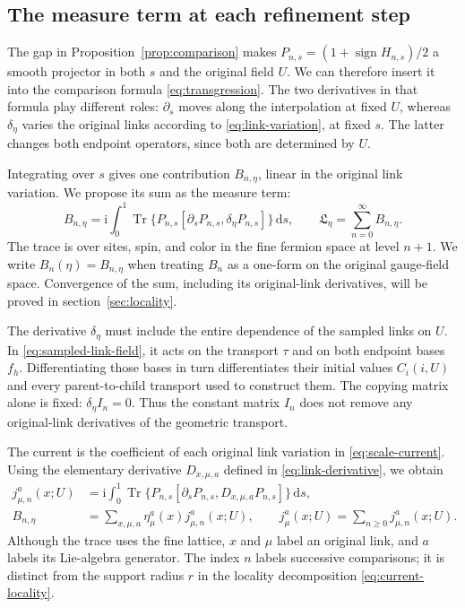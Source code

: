 \documentclass[11pt,a4paper]{article}
\theoremstyle{remark}
\DeclareMathOperator{\Tr}{Tr}
\newcommand{\dd}{\mathrm d}
\newcommand{\ii}{\mathrm i}
\begin{document}
\subsection{The measure term at each refinement step}

The gap in Proposition~\ref{prop:comparison} makes
$P_{n,s}=(1+\operatorname{sign}H_{n,s})/2$ a smooth projector in both
$s$ and the original field $U$. We can therefore insert it into the
comparison formula \eqref{eq:transgression}. The two derivatives in that
formula play different roles: $\partial_s$ moves along the interpolation
at fixed $U$, whereas $\delta_\eta$ varies the original links according
to \eqref{eq:link-variation}, at fixed $s$. The latter changes both
endpoint operators, since both are determined by $U$.

Integrating over $s$ gives one contribution $B_{n,\eta}$, linear in the
original link variation. We propose its sum as the measure term:
\begin{equation}
 B_{n,\eta}=\ii\int_0^1\Tr\{P_{n,s}
       [\partial_sP_{n,s},\delta_\eta P_{n,s}]\}\,\dd s,
 \qquad
 \mathfrak L_\eta=\sum_{n=0}^\infty B_{n,\eta}.
 \label{eq:scale-current}
\end{equation}
The trace is over sites, spin, and color in the fine fermion space at
level $n+1$. We write $B_n(\eta)=B_{n,\eta}$ when treating $B_n$ as
a one-form on the original gauge-field space. Convergence of the sum,
including its original-link derivatives, will be proved in
section~\ref{sec:locality}.

The derivative $\delta_\eta$ must include the entire dependence of the
sampled links on $U$. In \eqref{eq:sampled-link-field}, it acts on the
transport $\tau$ and on both endpoint bases $f_h$. Differentiating those
bases in turn differentiates their initial values $C_i(i,U)$ and every
parent-to-child transport used to construct them. The copying matrix
alone is fixed: $\delta_\eta I_n=0$. Thus the constant matrix $I_n$
does not remove any original-link derivatives of the geometric transport.

The current is the coefficient of each original link variation in
\eqref{eq:scale-current}. Using the elementary derivative
$D_{x,\mu,a}$ defined in \eqref{eq:link-derivative}, we obtain
\begin{equation}
 \begin{split}
 j_{\mu,n}^a(x;U)
 &=\ii\int_0^1\Tr\{P_{n,s}
             [\partial_sP_{n,s},D_{x,\mu,a}P_{n,s}]\}\,\dd s,\\
 B_{n,\eta}
 &=\sum_{x,\mu,a}\eta_\mu^a(x)j_{\mu,n}^a(x;U),
 \qquad j_\mu^a(x;U)=\sum_{n\ge0}j_{\mu,n}^a(x;U).
 \end{split}
 \label{eq:comparison-current-components}
\end{equation}
Although the trace uses the fine lattice, $x$ and $\mu$ label an original
link, and $a$ labels its Lie-algebra generator. The index $n$ labels
successive comparisons; it is distinct from the support radius $r$ in
the locality decomposition \eqref{eq:current-locality}.
\end{document}
